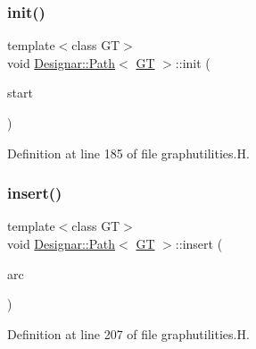 \subsubsection{\texorpdfstring{init()}{init()}}
{\footnotesize\ttfamily template$<$class GT$>$ \\
void \hyperlink{class_designar_1_1_path}{Designar\+::\+Path}$<$ \hyperlink{demo-buildgraph_8_c_a3001c40d2c31ca87ed96cd7d1334a55e}{GT} $>$\+::init (\begin{DoxyParamCaption}\item[{\hyperlink{class_designar_1_1_path_a7b499fd50e96e3360968d4cfef7a3736}{Node\+Type} \&}]{start }\end{DoxyParamCaption})\hspace{0.3cm}{\ttfamily [inline]}}



Definition at line 185 of file graphutilities.\+H.

\mbox{\label{class_designar_1_1_path_a0deab29b3241b5df6217bdc705dab131}} 
\subsubsection{\texorpdfstring{insert()}{insert()}\hspace{0.1cm}{\footnotesize\ttfamily [1/2]}}
{\footnotesize\ttfamily template$<$class GT$>$ \\
void \hyperlink{class_designar_1_1_path}{Designar\+::\+Path}$<$ \hyperlink{demo-buildgraph_8_c_a3001c40d2c31ca87ed96cd7d1334a55e}{GT} $>$\+::insert (\begin{DoxyParamCaption}\item[{\hyperlink{class_designar_1_1_path_a6e13966351659cedcf3233098b2b7384}{Arc\+Type} \&}]{arc }\end{DoxyParamCaption})\hspace{0.3cm}{\ttfamily [inline]}}



Definition at line 207 of file graphutilities.\+H.

\mbox{\label{class_designar_1_1_path_a9f3a77788f312c464d46d4f76f9b9d6a}} 
